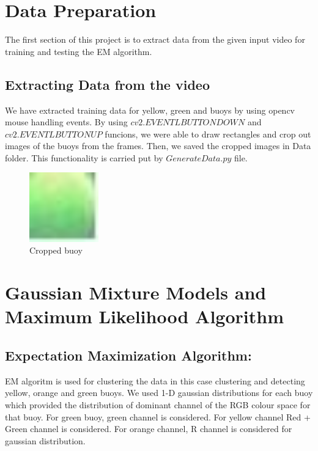 \documentclass[12pt]{article}
\begin{document}
\section{Data Preparation} 
The first section of this project is to extract data from the given input video for training and testing the EM algorithm.

\subsection{Extracting Data from the video}
We have extracted training data for yellow, green and buoys by using opencv mouse handling events. By using $cv2.EVENTLBUTTONDOWN$ and $cv2.EVENTLBUTTONUP$ funcions, we were able to draw rectangles and crop out images of the buoys from the frames. Then, we saved the cropped images in Data folder. This functionality is carried put by $GenerateData.py$ file.
\begin{figure}[h]
    \centering
    \includegraphics[width=3cm]{buoyimage}
    \caption{Cropped buoy}
    \label{fig:Cropped buoy for training data}
\end{figure}

\section{Gaussian Mixture Models and Maximum Likelihood Algorithm}
\subsection{Expectation Maximization Algorithm:}
EM algoritm is used for clustering the data in this case clustering and detecting yellow, orange and green buoys. We used 1-D gaussian distributions for each buoy which provided the distribution of dominant channel of the RGB colour space for that buoy. For green buoy, green channel is considered. For yellow channel Red + Green channel is considered. For orange channel, R channel is considered for gaussian distribution.
\end{document}
